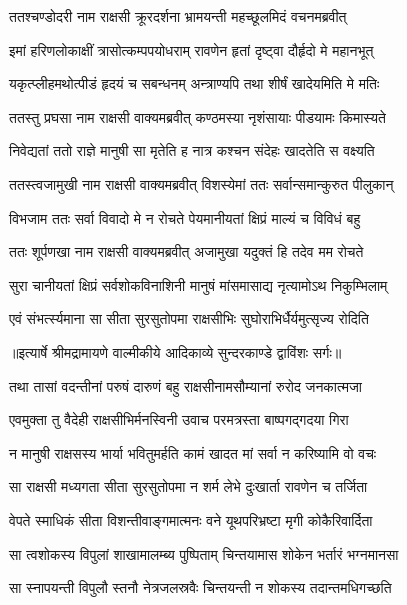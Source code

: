 \twolineshloka
{ततश्चण्डोदरी नाम राक्षसी क्रूरदर्शना}
{भ्रामयन्ती महच्छूलमिदं वचनमब्रवीत्} %

\twolineshloka
{इमां हरिणलोकाक्षीं त्रासोत्कम्पपयोधराम्}
{रावणेन हृतां दृष्ट्वा दौर्हृदो मे महानभूत्} %

\twolineshloka
{यकृत्प्लीहमथोत्पीडं हृदयं च सबन्धनम्}
{अन्त्राण्यपि तथा शीर्षं खादेयमिति मे मतिः} %

\twolineshloka
{ततस्तु प्रघसा नाम राक्षसी वाक्यमब्रवीत्}
{कण्ठमस्या नृशंसायाः पीडयामः किमास्यते} %

\twolineshloka
{निवेद्यतां ततो राज्ञे मानुषी सा मृतेति ह}
{नात्र कश्चन संदेहः खादतेति स वक्ष्यति} %

\twolineshloka
{ततस्त्वजामुखी नाम राक्षसी वाक्यमब्रवीत्}
{विशस्येमां ततः सर्वान्समान्कुरुत पीलुकान्} %

\twolineshloka
{विभजाम ततः सर्वा विवादो मे न रोचते}
{पेयमानीयतां क्षिप्रं माल्यं च विविधं बहु} %

\twolineshloka
{ततः शूर्पणखा नाम राक्षसी वाक्यमब्रवीत्}
{अजामुखा यदुक्तं हि तदेव मम रोचते} %

\twolineshloka
{सुरा चानीयतां क्षिप्रं सर्वशोकविनाशिनी}
{मानुषं मांसमासाद्य नृत्यामोऽथ निकुम्भिलाम्} %

\twolineshloka
{एवं संभर्त्स्यमाना सा सीता सुरसुतोपमा}
{राक्षसीभिः सुघोराभिर्धैर्यमुत्सृज्य रोदिति} %


{॥इत्यार्षे श्रीमद्रामायणे वाल्मीकीये आदिकाव्ये सुन्दरकाण्डे द्वाविंशः सर्गः॥}


\twolineshloka
{तथा तासां वदन्तीनां परुषं दारुणं बहु}
{राक्षसीनामसौम्यानां रुरोद जनकात्मजा} %

\twolineshloka
{एवमुक्ता तु वैदेही राक्षसीभिर्मनस्विनी}
{उवाच परमत्रस्ता बाष्पगद्गदया गिरा} %

\twolineshloka
{न मानुषी राक्षसस्य भार्या भवितुमर्हति}
{कामं खादत मां सर्वा न करिष्यामि वो वचः} %

\twolineshloka
{सा राक्षसी मध्यगता सीता सुरसुतोपमा}
{न शर्म लेभे दुःखार्ता रावणेन च तर्जिता} %

\twolineshloka
{वेपते स्माधिकं सीता विशन्तीवाङ्गमात्मनः}
{वने यूथपरिभ्रष्टा मृगी कोकैरिवार्दिता} %

\twolineshloka
{सा त्वशोकस्य विपुलां शाखामालम्ब्य पुष्पिताम्}
{चिन्तयामास शोकेन भर्तारं भग्नमानसा} %

\twolineshloka
{सा स्नापयन्ती विपुलौ स्तनौ नेत्रजलस्रवैः}
{चिन्तयन्ती न शोकस्य तदान्तमधिगच्छति} %

